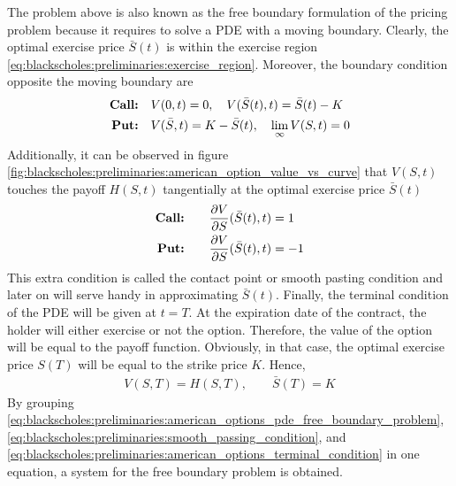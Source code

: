 The problem above is also known as the free boundary formulation of the pricing problem because it requires to solve a PDE with a moving boundary. Clearly, the optimal exercise price $\bar{S}(t)$ is within the exercise region \eqref{eq:blackscholes:preliminaries:exercise_region}. Moreover, the boundary condition opposite the moving boundary are
\begin{subequations}
  \begin{align}
    \text{\textbf{Call:}} \quad& V(0,t) = 0, \quad V(\bar{S}(t),t) = \bar{S}(t) - K\\
    \text{\textbf{Put:}} \quad& V(\bar{S},t) = K - \bar{S}(t), \quad \lim_{\infty}V(S, t)=0
    \label{eq:blackscholes:preliminaries:american_options_boundary_conditions}
  \end{align}
\end{subequations}
Additionally, it can be observed in figure \eqref{fig:blackscholes:preliminaries:american_option_value_vs_curve} that $V(S,t)$ touches the payoff $H(S,t)$ tangentially at the optimal exercise price $\bar{S}(t)$ 
\begin{subequations} \label{eq:blackscholes:preliminaries:smooth_passing_condition}
  \begin{align}
    \text{\textbf{Call:}} \qquad &\dfrac{\partial{V}}{\partial{S}}(\bar{S}(t), t) = 1\\
    \text{\textbf{Put:}} \qquad &\dfrac{\partial{V}}{\partial{S}}(\bar{S}(t), t) = -1
  \end{align}
\end{subequations}
This extra condition is called the contact point or smooth pasting condition and later on will serve handy in approximating $\bar{S}(t)$. Finally, the terminal condition of the PDE will be given at $t=T$. At the expiration date of the contract, the holder will either exercise or not the option. Therefore, the value of the option will be equal to the payoff function. Obviously, in that case, the optimal exercise price $S(T)$ will be equal to the strike price $K$. Hence,
\begin{align}
  V(S,T) = H(S, T), \qquad \bar{S}(T) = K
  \label{eq:blackscholes:preliminaries:american_options_terminal_condition}
\end{align}
By grouping \eqref{eq:blackscholes:preliminaries:american_options_pde_free_boundary_problem}, \eqref{eq:blackscholes:preliminaries:smooth_passing_condition}, and \eqref{eq:blackscholes:preliminaries:american_options_terminal_condition} in one equation, a system for the free boundary problem is obtained.
